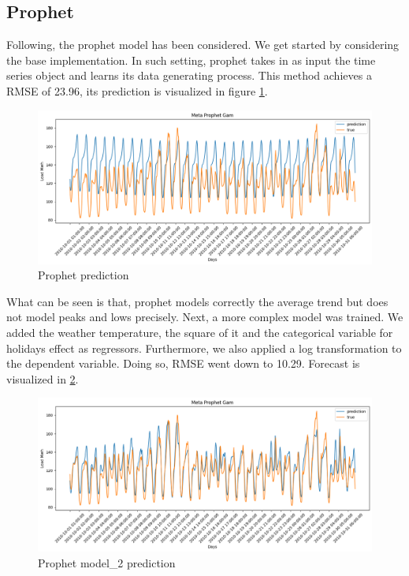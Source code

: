\subsection{Prophet}
Following, the prophet model has been considered. 
We get started by considering the base implementation. In such setting, prophet takes in as input the time series object and learns its data generating process.
This method achieves a RMSE of 23.96, its prediction is visualized in figure \ref{fig:prophet_price_1}.
\begin{figure}[!h]
    \includegraphics[width=\textwidth]{images/prophet_price_1.png}
    \caption{Prophet prediction}
    \label{fig:prophet_price_1}
\end{figure}
What can be seen is that, prophet models correctly the average trend but does not model peaks and lows precisely. 
Next, a more complex model was trained. We added the weather temperature, the square of it and the categorical variable for holidays effect as regressors. Furthermore, we also applied a log transformation to the dependent variable. Doing so, RMSE went down to 10.29. Forecast is visualized in \ref{fig:prophet_price2}.
\begin{figure}[!h]
    \includegraphics[width=\textwidth]{images/prophet_price2.png}
    \caption{Prophet model\_2 prediction}
    \label{fig:prophet_price2}
\end{figure}

